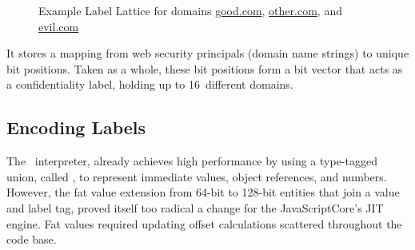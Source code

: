 \begin{figure}[ht]
{
}
  \caption{Example Label Lattice for domains \url{good.com}, \url{other.com}, and \url{evil.com}}
  \label{fig:jitflow-label-lattice}
\end{figure}

It stores a mapping from web security principals (domain name strings) to unique bit positions.
Taken as a whole, these bit positions form a bit vector that acts as a confidentiality label, holding up to 16~different domains.

\subsection{Encoding Labels}
\label{sec:jitflow-labelencoding}


The \FlowCore\ interpreter, already achieves high performance by using a type-tagged union, called \jsvalue, to represent immediate values, object references, and numbers.
However, the fat value extension from 64-bit \jsvalues to 128-bit entities that join a value and label tag, proved itself too radical a change for the JavaScriptCore's JIT engine.
Fat values required updating offset calculations scattered throughout the code base.

